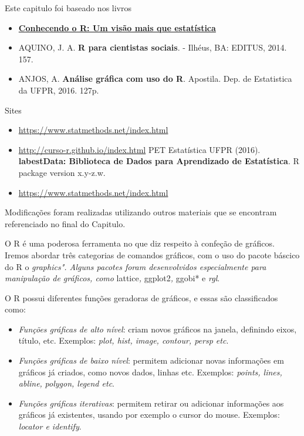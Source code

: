 \documentclass[
]{book}
\begin{document}
Este capitulo foi baseado nos livros

\begin{itemize}
\item
  \href{https://www.editoraufv.com.br/produto/conhecendo-o-r-uma-visao-mais-que-estatistica/1109294}{\textbf{Conhecendo o R: Um visão mais que estatística}}
\item
  AQUINO, J. A. \textbf{R para cientistas sociais}. - Ilhéus, BA: EDITUS, 2014. 157.
\item
  ANJOS, A. \textbf{Análise gráfica com uso do R}. Apostila. Dep. de Estatistica da UFPR, 2016. 127p.
\end{itemize}

Sites

\begin{itemize}
\item
  \url{https://www.statmethods.net/index.html}
\item
  \url{http://curso-r.github.io/index.html} PET Estatística UFPR (2016). \textbf{labestData: Biblioteca de Dados para Aprendizado de Estatística}. R package version x.y-z.w.
\item
  \url{https://www.statmethods.net/index.html}
\end{itemize}

Modificações foram realizadas utilizando outros materiais que se encontram referenciado no final do Capitulo.

O R é uma poderosa ferramenta no que diz respeito à confeção de gráficos. Iremos abordar três categorias de comandos gráficos, com o uso do pacote báscico do R o \emph{graphics". Alguns pacotes foram desenvolvidos especialmente para manipulação de gráficos, como
}lattice\emph{, }ggplot2\emph{, }ggobi* e \emph{rgl}.

O R possui diferentes funções geradoras de gráficos, e essas são classificados como:

\begin{itemize}
\item
  \emph{Funções gráficas de alto nível}: criam novos gráficos na janela, definindo eixos, título, etc. Exemplos: \emph{plot, hist, image, contour, persp etc}.
\item
  \emph{Funções gráficas de baixo nível}: permitem adicionar novas informações em gráficos já criados, como novos dados, linhas etc. Exemplos: \emph{points, lines, abline,} \emph{polygon, legend etc}.
\item
  \emph{Funções gráficas iterativas}: permitem retirar ou adicionar informações aos gráficos já existentes, usando por exemplo o cursor do mouse. Exemplos: \emph{locator e identify}.
\end{itemize}
\end{document}
